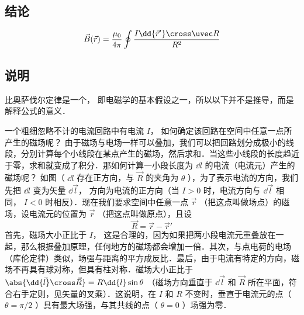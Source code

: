 
\subsection{结论}
\begin{equation}
\vec B(\vec r) = \frac{\mu_0}{4\pi} \oint \frac{I \dd{\vec r'} \cross \uvec R}{R^2}
\end{equation}
\subsection{说明}
比奥萨伐尔定律是一个， 即电磁学的基本假设之一，所以以下并不是推导，而是解释公式的意义．

一个粗细忽略不计的电流回路中有电流 $I$， 如何确定该回路在空间中任意一点所产生的磁场呢？ 由于磁场与电场一样可以叠加，我们可以把回路划分成极小的线段，分别计算每个小线段在某点产生的磁场，然后求和．当这些小线段的长度趋近于零，求和就变成了积分．那如何计算一小段长度为 $\dd{l}$ 的电流（电流元）产生的磁场呢？ 如图（%
 $\dd{l}$ 存在正方向，与 $\vec R$ 的夹角为 $\theta$ ），为了表示电流的方向，我们先把 $\dd{l}$ 变为矢量 $\dd{\vec l}$， 方向为电流的正方向（当 $I > 0$ 时，电流方向与 $\dd{\vec l}$ 相同， $I < 0$ 时相反）．现在我们要求空间中任意一点 $\vec r$ （把这点叫做场点）的磁场，设电流元的位置为 $\vec r$ （把这点叫做原点），且设
\begin{equation}
\vec R = \vec r - \vec r'
\end{equation}
首先，磁场大小正比于 $I$， 这是合理的，因为如果把两小段电流元重叠放在一起，那么根据叠加原理，任何地方的磁场都会增加一倍．其次，与点电荷的电场（库伦定律）类似，场强与距离的平方成反比．最后，由于电流有特定的方向，磁场不再具有球对称，但具有柱对称．磁场大小正比于 $\abs{\dd{\vec l} \cross \vec R} = R \dd{l} \sin\theta $ （磁场方向垂直于 $\dd{\vec l}$ 和 $\vec R$ 所在平面，符合右手定则，见矢量的叉乘）．这说明，在 $I$ 和 $R$ 不变时，垂直于电流元的点（ $\theta  = \pi /2$ ）具有最大场强，与其共线的点（ $\theta  = 0$ ）场强为零．

